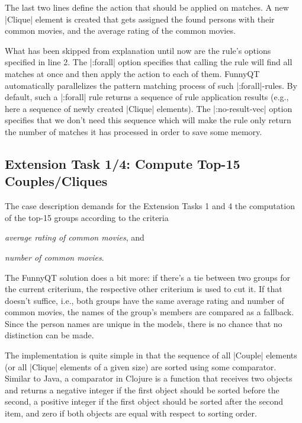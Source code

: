 \documentclass[submission]{eptcs}
\newcommand{\code}{\clojureinline}
\begin{document}
The last two lines define the action that should be applied on matches.  A new
\code|Clique| element is created that gets assigned the found persons with
their common movies, and the average rating of the common movies.

What has been skipped from explanation until now are the rule's options
specified in line 2.  The \code|:forall| option specifies that calling the rule
will find all matches at once and then apply the action to each of them.
FunnyQT automatically parallelizes the pattern matching process of such
\code|:forall|-rules.  By default, such a \code|:forall| rule returns a
sequence of rule application results (e.g., here a sequence of newly created
\code|Clique| elements).  The \code|:no-result-vec| option specifies that we
don't need this sequence which will make the rule only return the number of
matches it has processed in order to save some memory.


\subsection{Extension Task 1/4: Compute Top-15 Couples/Cliques}
\label{sec:ext-task-1:top-15}

The case description demands for the Extension Tasks 1 and 4 the computation of
the top-15 groups according to the criteria
\begin{inparaenum}[(a)]
\item \emph{average rating of common movies}, and
\item \emph{number of common movies}.
\end{inparaenum}
The FunnyQT solution does a bit more: if there's a tie between two groups for
the current criterium, the respective other criterium is used to cut it.  If
that doesn't suffice, i.e., both groups have the same average rating and number
of common movies, the names of the group's members are compared as a fallback.
Since the person names are unique in the models, there is no chance that no
distinction can be made.

The implementation is quite simple in that the sequence of all \code|Couple|
elements (or all \code|Clique| elements of a given size) are sorted using some
comparator.  Similar to Java, a comparator in Clojure is a function that
receives two objects and returns a negative integer if the first object should
be sorted before the second, a positive integer if the first object should be
sorted after the second item, and zero if both objects are equal with respect
to sorting order.
\end{document}
